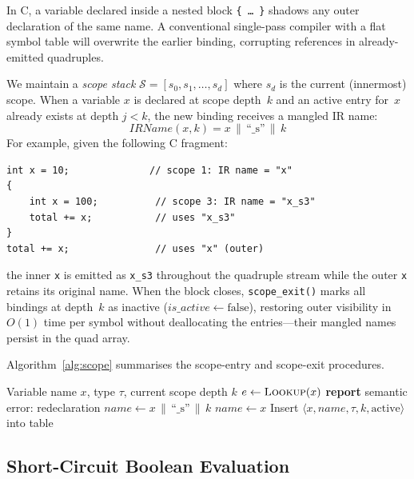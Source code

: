 \documentclass[conference]{IEEEtran}
\begin{document}
In C, a variable declared inside a nested block \texttt{\{~\ldots~\}} shadows any outer declaration of the same name. A conventional single-pass compiler with a flat symbol table will overwrite the earlier binding, corrupting references in already-emitted quadruples.

We maintain a \emph{scope stack} $\mathcal{S} = [s_0, s_1, \ldots, s_d]$ where $s_d$ is the current (innermost) scope. When a variable $x$ is declared at scope depth~$k$ and an active entry for~$x$ already exists at depth $j<k$, the new binding receives a mangled IR name:
\begin{equation}
\label{eq:mangle}
\mathit{IRName}(x, k) = x \,\|\, \text{``\_s''} \,\|\, k
\end{equation}
For example, given the following C fragment:
\begin{lstlisting}
int x = 10;              // scope 1: IR name = "x"
{
    int x = 100;          // scope 3: IR name = "x_s3"
    total += x;           // uses "x_s3"
}
total += x;               // uses "x" (outer)
\end{lstlisting}
the inner \texttt{x} is emitted as \texttt{x\_s3} throughout the quadruple stream while the outer \texttt{x} retains its original name. When the block closes, \texttt{scope\_exit()} marks all bindings at depth~$k$ as inactive ($\mathit{is\_active} \leftarrow \mathrm{false}$), restoring outer visibility in $O(1)$ time per symbol without deallocating the entries---their mangled names persist in the quad array.

Algorithm~\ref{alg:scope} summarises the scope-entry and scope-exit procedures.

\begin{algorithm}[t]
\caption{Scope-Aware Symbol Insertion}
\label{alg:scope}
\begin{algorithmic}[1]
\REQUIRE Variable name $x$, type $\tau$, current scope depth $k$
\STATE $e \leftarrow \textsc{Lookup}(x)$ 
    \STATE \textbf{report} semantic error: redeclaration
    \STATE $\mathit{name} \leftarrow x \,\|\, \text{``\_s''} \,\|\, k$ 
\ELSE
    \STATE $\mathit{name} \leftarrow x$
\ENDIF
\STATE Insert $\langle x, \mathit{name}, \tau, k, \mathrm{active}\rangle$ into table
\end{algorithmic}
\end{algorithm}

\subsection{Short-Circuit Boolean Evaluation}
\label{sec:boolean}
\end{document}
